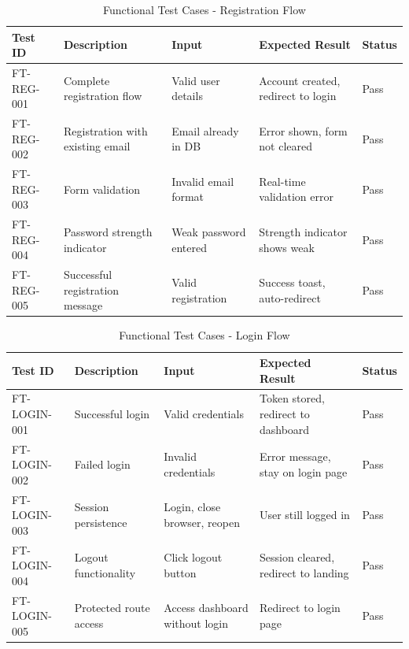 \documentclass[12pt,a4paper]{article}
\begin{document}
    \begin{table}[H]
        \caption{Functional Test Cases - Registration Flow}
        \begin{tabular}{|p{2cm}|p{4cm}|p{3cm}|p{3cm}|p{1.5cm}|}
            \hline
            \textbf{Test ID} & \textbf{Description} & \textbf{Input} & \textbf{Expected Result} & \textbf{Status} \\
            \hline
            FT-REG-001 & Complete registration flow & Valid user details & Account created, redirect to login & Pass \\
            \hline
            FT-REG-002 & Registration with existing email & Email already in DB & Error shown, form not cleared & Pass \\
            \hline
            FT-REG-003 & Form validation & Invalid email format & Real-time validation error & Pass \\
            \hline
            FT-REG-004 & Password strength indicator & Weak password entered & Strength indicator shows weak & Pass \\
            \hline
            FT-REG-005 & Successful registration message & Valid registration & Success toast, auto-redirect & Pass \\
            \hline
        \end{tabular}
    \end{table}

    \begin{table}[H]
        \caption{Functional Test Cases - Login Flow}
        \begin{tabular}{|p{2cm}|p{4cm}|p{3cm}|p{3cm}|p{1.5cm}|}
            \hline
            \textbf{Test ID} & \textbf{Description} & \textbf{Input} & \textbf{Expected Result} & \textbf{Status} \\
            \hline
            FT-LOGIN-001 & Successful login & Valid credentials & Token stored, redirect to dashboard & Pass \\
            \hline
            FT-LOGIN-002 & Failed login & Invalid credentials & Error message, stay on login page & Pass \\
            \hline
            FT-LOGIN-003 & Session persistence & Login, close browser, reopen & User still logged in & Pass \\
            \hline
            FT-LOGIN-004 & Logout functionality & Click logout button & Session cleared, redirect to landing & Pass \\
            \hline
            FT-LOGIN-005 & Protected route access & Access dashboard without login & Redirect to login page & Pass \\
            \hline
        \end{tabular}
    \end{table}
\end{document}
